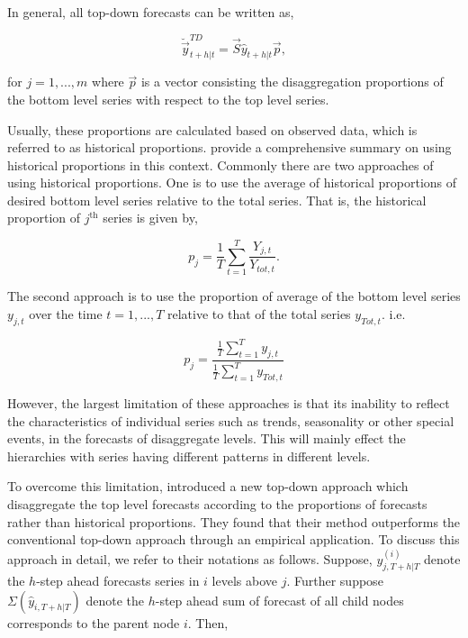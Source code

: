 \documentclass[graybox]{svmult}
\begin{document}
In general, all top-down forecasts can be written as, 

\begin{equation}
\breve{\vec{y}}^{TD}_{t+h|t}=\vec{S}\hat{y}_{t+h|t}\vec{p},
\end{equation}

for $j=1,...,m$ where $\vec{p}$ is a vector consisting the disaggregation proportions of the bottom level series with respect to the top level series. 
 
Usually, these proportions are calculated based on observed data, which is referred to as historical proportions. \cite{gross1990} provide a comprehensive summary on using historical proportions in this context. Commonly there are two approaches of using historical proportions. One is to use the average of historical proportions of desired bottom level series relative to the total series. That is, the historical proportion of $j^{\text{th}}$ series is given by, 

\begin{equation}
p_j = \frac{1}{T} \sum_{t=1}^{T}\frac{Y_{j,t}}{Y_{tot,t}}.
\end{equation}

The second approach is to use the proportion of average of the bottom level series $y_{j,t}$ over the time $t=1,...,T$ relative to that of the total series $y_{Tot,t}$. i.e.

\begin{equation}
p_j = \frac{\frac{1}{T}\sum_{t=1}^{T}y_{j,t}}{\frac{1}{T}\sum_{t=1}^{T}y_{Tot,t}}
\end{equation}

However, the largest limitation of these approaches is that its inability to reflect the characteristics of individual series such as trends, seasonality or other special events, in the forecasts of disaggregate levels. This will mainly effect the hierarchies with series having different patterns in different levels.  

To overcome this limitation, \cite{athanasopoulos2009} introduced a new top-down approach which disaggregate the top level forecasts according to the proportions of forecasts rather than historical proportions. They found that their method outperforms the conventional top-down approach through an empirical application. To discuss this approach in detail, we refer to their notations as follows. Suppose, $y^{(i)}_{j,T+h|T}$ denote the $h$-step ahead forecasts series in $i$ levels above $j$. Further suppose $\Sigma(\hat{y}_{i,T+h|T})$ denote the $h$-step ahead sum of forecast of all child nodes corresponds to the parent node $i$. Then,
\end{document}
